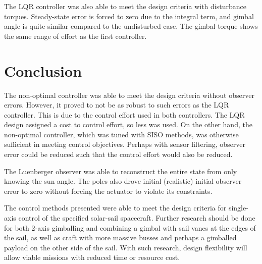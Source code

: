 \documentclass[]{aiaa-tc}%
\begin{document}
	The LQR controller was also able to meet the design criteria with disturbance torques. Steady-state error is forced to zero due to the integral term, and gimbal angle is quite similar compared to the undisturbed case. The gimbal torque shows the same range of effort as the first controller. 

	\section{Conclusion}

	The non-optimal controller was able to meet the design criteria without observer errors. However, it proved to not be as robust to such errors as the LQR controller. This is due to the control effort used in both controllers. The LQR design assigned a cost to control effort, so less was used. On the other hand, the non-optimal controller, which was tuned with SISO methods, was otherwise sufficient in meeting control objectives. Perhaps with sensor filtering, observer error could be reduced such that the control effort would also be reduced. 

	\vspace{5 mm}

	The Luenberger observer was able to reconstruct the entire state from only knowing the sun angle. The poles also drove initial (realistic) initial observer error to zero without forcing the actuator to violate its constraints.

	\vspace{5 mm}

	The control methods presented were able to meet the design criteria for single-axis control of the specified solar-sail spacecraft. Further research should be done for both 2-axis gimballing and combining a gimbal with sail vanes at the edges of the sail, as well as craft with more massive busses and perhaps a gimballed payload on the other side of the sail. With such research, design flexibility will allow viable missions with reduced time or resource cost.



%    
    
\end{document}
